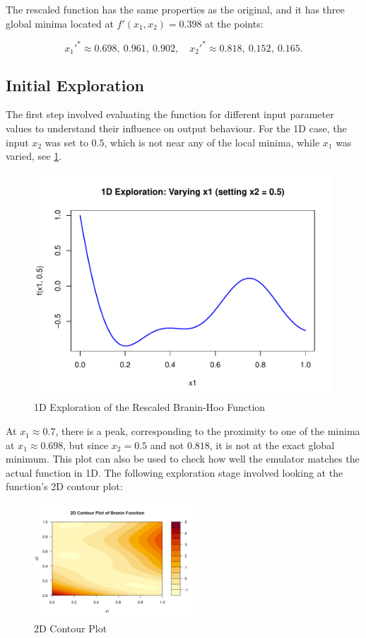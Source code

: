 \documentclass[12pt]{report} %
\begin{document}
The rescaled function has the same properties as the original, and it has three global minima located at $f'(x_1, x_2) = 0.398$ at the points: 

\[
x_1'^* \approx 0.698, \ 0.961, \ 0.902, \quad x_2'^* \approx 0.818, \ 0.152, \ 0.165.
\]

\subsection{Initial Exploration}
The first step involved evaluating the function for different input parameter values to understand their influence on output behaviour. For the 1D case, the input $x_2$ was set to $0.5$, which is not near any of the local minima, while $x_1$ was varied, see \ref{fig:1D Exploration}.

\begin{figure}[H]
    \centering
    \includegraphics[width=0.45 \textwidth]{1D Exploration.pdf}
    \caption{1D Exploration of the Rescaled Branin-Hoo Function}
    \label{fig:1D Exploration}
\end{figure}

\noindent At $x_1 \approx 0.7$, there is a peak, corresponding to the proximity to one of the minima at $x_1 \approx 0.698$, but since $x_2 = 0.5$ and not $0.818$, it is not at the exact global minimum. This plot can also be used to check how well the emulator matches the actual function in 1D. The following exploration stage involved looking at the function's 2D contour plot:

\begin{figure}[H]
    \centering
    \includegraphics[width=0.55\textwidth]{2D Contour Plot.png}
    \caption{2D Contour Plot}
    \label{fig:2D Contour}
\end{figure}
\end{document}
